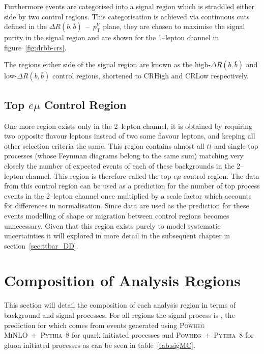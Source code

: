 Furthermore events are categorised into a signal region which is straddled
either side by two control regions. This categorisation is achieved via
continuous cuts defined in the $\Delta R(b, \bar{b})$~--~$p_{\mathrm{T}}^{V}$ plane,
they are chosen to maximise the signal purity in the signal region and are shown
for the 1--lepton channel in figure~\ref{fig:drbb-crs}.

The regions either side of the signal region are known as the
high-$\Delta R(b, \bar{b})$ and low-$\Delta R(b, \bar{b})$ control regions,
shortened to CRHigh and CRLow respectively.

\subsection{Top \texorpdfstring{$e \mu$}{e mu} Control Region}%
\label{sec:topemucr}

One more region exists only in the 2--lepton channel, it is obtained by
requiring two opposite flavour leptons instead of two same flavour leptons, and
keeping all other selection criteria the same. This region contains almost all
$t\bar{t}$ and single top processes (whose Feynman diagrams belong to the same
sum) matching very closely the number of expected events of each of these
backgrounds in the 2--lepton channel. This region is therefore called the top $e
\mu$ control region. The data from this control region can be used as a
prediction for the number of top process events in the 2--lepton channel once
multiplied by a scale factor which accounts for differences in normalisation.
Since data are used as the prediction for these events modelling of shape or
migration between control regions becomes unnecessary. Given that this region
exists purely to model systematic uncertainties it will explored in more detail
in the subsequent chapter in section~\ref{sec:ttbar_DD}.

\section{Composition of Analysis Regions}
\label{sec:composition}

This section will detail the composition of each analysis region in terms of
background and signal processes. For all regions the signal process is
\VHbb, the prediction for which comes from events generated using \textsc{Powheg
  MiNLO}~+~\textsc{Pythia~8} for quark initiated processes and
\textsc{Powheg}~+~\textsc{Pythia~8} for gluon initiated processes as can be seen
in table~\ref{tab:sigMC}.


